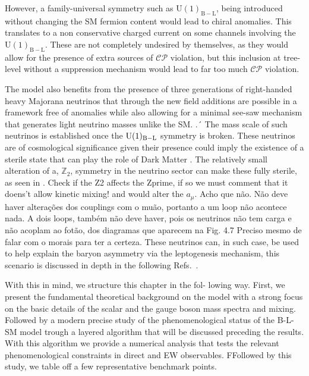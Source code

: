However, a family-universal symmetry such as $\mathrm{U(1)_{B-L}}$, being introduced without changing the SM fermion content would lead to chiral anomalies. This translates to a non conservative charged current on some channels involving the $\mathrm{U(1)_{B-L}}$. These are not completely undesired by themselves, as they would allow for the presence of extra sources of $\mathcal{CP}$ violation, but this inclusion at tree-level without a suppression mechanism would lead to far too much $\mathcal{CP}$ violation. 

The model also benefits from the presence of three generations of right-handed heavy Majorana neutrinos that through the new field additions are possible in a framework free of anomalies while also allowing for a minimal see-saw mechanism that generates light neutrino masses unlike the SM.  \cite{Yanagida:1979as,GellMann:1980vs,Mohapatra:1979ia}.´
%
The mass scale of such neutrinos is established once the $\mathrm{U}(1)_{\mathrm{B-L}}$ symmetry is broken. 
%
These neutrinos are of cosmological significance given their presence could imply the existence of a sterile state that can play the role of Dark Matter \cite{Kaneta:2016vkq}.
%
The relatively small alteration of a, $\mathbb{Z}_2$, symmetry in the neutrino sector can make these fully sterile, as seen in \cite{Okada:2010wd,Okada:2018ktp}. {\color{red} Check if the Z2 affects the Zprime, if so we must comment that it doens't allow kinetic mixing! and would alter the $a_\mu$. Acho que não. Não deve haver alterações dos couplings com o muão, portanto a um loop não acontece nada. A dois loops, também não deve haver, pois os neutrinos não tem carga e não acoplam ao fotão, dos diagramas que aparecem na Fig. 4.7 Preciso mesmo de falar com o morais para ter a certeza.}
%
These neutrinos can, in such case, be used to help explain the baryon asymmetry via the leptogenesis mechanism, this scenario is discussed in depth in the following Refs.~\cite{Fukugita:1986hr,Pilaftsis:1997jf,Pilaftsis:2003gt}. 

With this in mind, we structure this chapter in the fol-
lowing way. First, we present the fundamental theoretical background on the model with a strong focus on the basic details of the scalar and the gauge boson mass spectra and mixing. Followed by a modern precise study of the phenomenological status of the B-L-SM model trough a layered algorithm that will be discussed preceding the results. With this algorithm we provide a numerical analysis that tests the relevant phenomenological constraints in direct and EW observables. FFollowed by this study, we table off a few representative benchmark points. 

